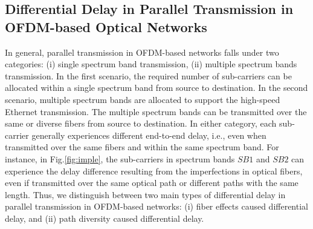 \documentclass[conference]{IEEEtran}
\begin{document}
\subsection{Differential Delay in Parallel Transmission in  OFDM-based Optical Networks}  
\par In general, parallel transmission in OFDM-based networks falls  under two categories: (i) single spectrum band transmission, (ii) multiple spectrum bands transmission. In the first scenario,  the required number of sub-carriers can be allocated within a single spectrum band from source to destination. In the second scenario, multiple spectrum bands are allocated to support the high-speed Ethernet transmission. The multiple spectrum bands can be transmitted over the same or diverse fibers from source to destination. In either category, each sub-carrier generally experiences different end-to-end delay, i.e., even when transmitted over the same fibers and within the same spectrum band. For instance, in Fig.\ref{fig:imple}, the sub-carriers in spectrum bands $SB1$ and $SB2$ can experience the delay difference resulting from the imperfections in optical fibers, even if transmitted over the same optical path or different paths with the same length. Thus, we distinguish between two main types of differential delay in parallel transmission in OFDM-based networks: (i) fiber effects caused differential delay, and (ii) path diversity caused differential delay.
\end{document}
